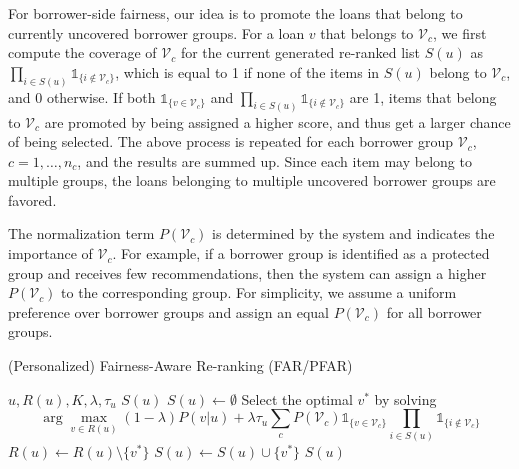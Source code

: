 
For borrower-side fairness, our idea is to promote the loans that belong to currently uncovered borrower groups. For a loan $v$ that belongs to $\mathcal V_c$, we first compute the coverage of $\mathcal V_c$ for the current generated re-ranked list $S(u)$ as $\prod_{i\in S(u)}\mathds{1}_{\{i\notin \mathcal V_c\}}$, which is equal to 1 if none of the items in $S(u)$ belong to $\mathcal V_c$, and 0 otherwise. If both $\mathds{1}_{\{v\in \mathcal V_c\}}$ and $\prod_{i\in S(u)}\mathds{1}_{\{i\notin \mathcal V_c\}}$ are 1, items that belong to $\mathcal V_c$ are promoted by being assigned a higher score, and thus get a larger chance of being selected. The above process is repeated for each borrower group $\mathcal V_c$, $c={1,\ldots,n_c}$, and the results are summed up. Since each item may belong to multiple groups, the loans belonging to multiple uncovered borrower groups are favored. 

The normalization term $P(\mathcal V_c)$ is determined by the system and indicates the importance of $\mathcal V_c$. For example, if a borrower group is identified as a protected group and receives few recommendations, then the system can assign a higher $P(\mathcal V_c)$ to the corresponding group. For simplicity, we assume a uniform preference over borrower groups and assign an equal $P(\mathcal V_c)$ for all borrower groups.



\begin{algorithm}[t]
\caption{(Personalized) Fairness-Aware Re-ranking (FAR/PFAR)}
\begin{algorithmic}[1]
\REQUIRE $u,R(u),K,\lambda, \tau_u$
\ENSURE $S(u)$
\STATE $S(u)\leftarrow\emptyset$
\STATE Select the optimal $v^*$ by solving $$\arg\max_{v\in R(u)}(1-\lambda)P(v|u)+\lambda\tau_u \sum_{c}P(\mathcal V_c)\mathds{1}_{\{v\in \mathcal V_c\}}\prod_{i\in S(u)}\mathds{1}_{\{i\notin \mathcal V_c\}}$$
\STATE $R(u)\leftarrow R(u)\setminus \{v^*\}$
\STATE $S(u)\leftarrow S(u)\cup\{v^*\}$
\ENDWHILE
\RETURN $S(u)$
\end{algorithmic}
\label{alg:main}
\end{algorithm}

